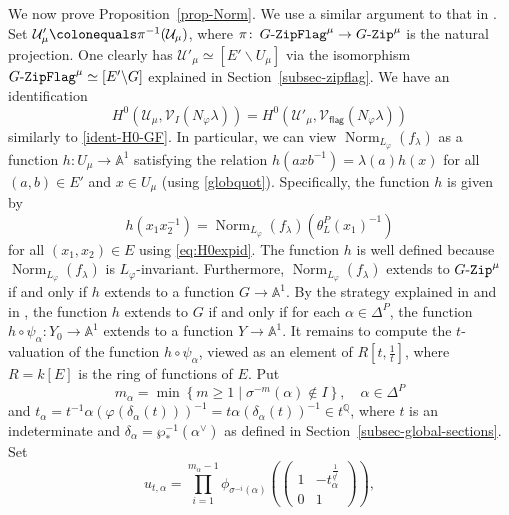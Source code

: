 \documentclass[10pt,a4paper]{article}
\numberwithin{equation}{section}
\theoremstyle{definition}
\theoremstyle{remark}
\newcommand{\GZip}{\mathop{\text{$G$-{\tt Zip}}}\nolimits}
\newcommand{\flag}{\mathsf{flag}}
\newcommand{\GF}{\mathop{\text{$G$-{\tt ZipFlag}}}\nolimits}
\newcommand{\Ucal}{{\mathcal U}}
\newcommand{\Vcal}{{\mathcal V}}
\renewcommand{\AA}{\mathbb{A}}
\newcommand{\QQ}{\mathbb{Q}}
\DeclareMathOperator{\Norm}{Norm}
\begin{document}
We now prove Proposition~\ref{prop-Norm}. We use a similar argument to that in \cite[Theorem 3.5.3]{Koskivirta-automforms-GZip}. Set $\Ucal'_\mu\colonequals\pi^{-1}(\Ucal_\mu)$, where $\pi\colon \GF^\mu\to \GZip^\mu$ is the natural projection. One  clearly has $\Ucal'_\mu\simeq [E'\backslash U_\mu]$ via the isomorphism $\GF^\mu\simeq [E'\backslash G]$ explained in Section~\ref{subsec-zipflag}. We have an identification
\begin{equation}
    H^0\left(\Ucal_\mu,\Vcal_I\left(N_\varphi\lambda\right)\right)=H^0\left(\Ucal'_\mu,\Vcal_{\flag}\left(N_{\varphi}\lambda\right)\right)
\end{equation}
similarly to \eqref{ident-H0-GF}. In particular, we can view $\Norm_{L_\varphi}(f_{\lambda})$ as a function $h\colon U_\mu\to \AA^1$ satisfying the relation $h(axb^{-1})=\lambda(a)h(x)$ for all $(a,b)\in E'$ and $x\in U_\mu$ (using \eqref{globquot}). Specifically, the function $h$ is given by 
\begin{equation}\label{functionh-eq}
  h\left(x_1x_2^{-1}\right)=\Norm_{L_\varphi}(f_\lambda)\left(\theta_L^P(x_1)^{-1}\right)
\end{equation}
for all $(x_1,x_2)\in E$ using \eqref{eq:H0expid}. 
The function $h$ is well defined because $\Norm_{L_\varphi}(f_\lambda)$ is $L_\varphi$-invariant. Furthermore, $\Norm_{L_\varphi}(f_\lambda)$ extends to $\GZip^\mu$ if and only if $h$ extends to a function $G\to \AA^1$. By the strategy explained in \cite[Section~3.2]{Koskivirta-automforms-GZip} and in \cite[Section~3.1]{Imai-Koskivirta-vector-bundles}, the function $h$ extends to $G$ if and only if for each $\alpha\in \Delta^P$, the function $h\circ \psi_\alpha \colon Y_0\to \AA^1$ extends to a function $Y\to \AA^1$. It remains to compute the $t$-valuation of the function $h\circ \psi_\alpha$, viewed as an element of $R[t,\frac{1}{t}]$, where $R=k[E]$ is the ring of functions of $E$. Put 
\begin{equation}\label{malpha-equ}
 m_{\alpha} =\min \left\{ m \geq 1 \mid 
 \sigma^{-m}(\alpha) \notin I \right\}, \quad \alpha \in \Delta^P
\end{equation}
and $t_{\alpha}=t^{-1}\alpha(\varphi(\delta_{\alpha}(t)))^{-1} =t \alpha(\delta_{\alpha}(t))^{-1} \in t^{\QQ}$, where $t$ is an indeterminate and $\delta_{\alpha}=\wp_*^{-1}(\alpha^{\vee})$ as defined in Section~\ref{subsec-global-sections}. Set
\[
 u_{t,\alpha}=\prod_{i=1}^{m_{\alpha}-1} \phi_{\sigma^{-i}(\alpha)} 
 \left( \begin{pmatrix}
1&-t_{\alpha}^{\frac{1}{q^i}}\\0&1
\end{pmatrix} \right),  
\]
\end{document}
